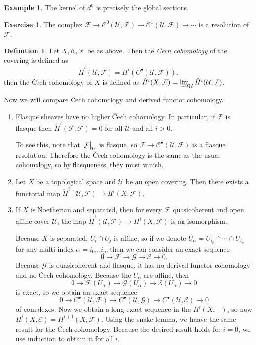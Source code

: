 \documentclass[leqno, openany]{memoir}
\theoremstyle{definition}
\newtheorem{defn}[thm]{Definition}
\newtheorem{exm}[thm]{Example}
\newtheorem{exer}[thm]{Exercise}
\theoremstyle{remark}
\theoremstyle{plain}
\theoremstyle{definition}
\theoremstyle{remark}
\newcommand{\mc}[1]{\mathcal{#1}}
\begin{document}
\begin{exm} The kernel of $d^0$ is precisely the global sections.  \end{exm}

\begin{exer} The complex $\mc{F} \to \mc{C}^0(\mc{U}, \mc{F}) \to
\mc{C}^1(\mc{U}, \mc{F}) \to \cdots$ is a resolution of $\mc{F}$.  \end{exer}

\begin{defn} Let $X, \mc{U}, \mc{F}$ be as above. Then the \textit{\v{C}ech
    cohomology} of the covering is defined as \[ \check{H}^i(\mc{U}, \mc{F}) =
    H^i(C^{\bullet}(\mc{U}, \mc{F})). \] then the \v{C}ech cohomology of $X$ is
    defined as $\check{H}^i(X, \mc{F}) = \varinjlim_{\mc{U}}
    \check{H}^i(\mc{U}, \mc{F})$.  \end{defn}

Now we will compare \v{C}ech cohomology and derived functor cohomology.
\begin{enumerate} \item Flasque sheaves have no higher \v{C}ech cohomology. In
    particular, if $\mc{F}$ is flasque then $\check{H}^i(\mc{F}, \mc{F}) = 0$
    for all $\mc{U}$ and all $i > 0$.

        To see this, note that $\eval{\mc{F}}_U$ is flasque, so $\mc{F} \to
        \mc{C}^{\bullet}(\mc{U}, \mc{F})$ is a flasque resolution. Therefore
        the \v{C}ech cohomology is the same as the usual cohomology, so by
        flasqueness, they must vanish.  \item Let $X$ be a topological space
        and $\mc{U}$ be an open covering. Then there exists a functorial map
        $\check{H}^i(\mc{U}, \mc{F}) \to H^i(X, \mc{F})$.  \item If $X$ is
        Noetherian and separated, then for every $\mc{F}$ quasicoherent and
        open affine cover $\mc{U}$, the map $\check{H}^i(\mc{U}, \mc{F}) \to
        H^i(X, \mc{F})$ is an isomorphism.

        Because $X$ is separated, $U_i \cap U_j$ is affine, so if we denote
        $U_{\alpha} = U_{i_0} \cap \cdots \cap U_{i_p}$ for any multi-index
        $\alpha = i_0 \ldots i_p$, then we can consider an exact sequence \[ 0
        \to \mc{F} \to \mc{G} \to \mc{E} \to 0. \] Because $\mc{G}$ is
        quasicoherent and flasque, it has no derived functor cohomology and no
        \v{C}ech cohomology. Because the $U_{\alpha}$ are affine, then \[ 0 \to
        \mc{F}(U_{\alpha}) \to \mc{G}(U_{\alpha}) \to \mc{E}(U_{\alpha}) \to 0
    \] is exact, so we obtain an exact sequence \[ 0 \to C^{\bullet}(\mc{U},
\mc{F}) \to C^{\bullet}(\mc{U}, \mc{G}) \to C^{\bullet}(\mc{U}, \mc{E}) \to 0
\] of complexes. Now we obtain a long exact sequence in the $H^i(X,-)$, so now
$H^i(X, \mc{E}) = H^{i+1}(X, \mc{F})$. Using the snake lemma, we haave the same
result for the \v{C}ech cohomology. Because the desired result holds for $i=0$,
we use induction to obtain it for all $i$.  \end{enumerate}
\end{document}
